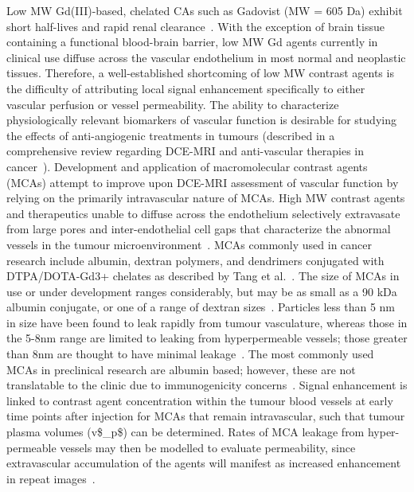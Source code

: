 Low \acs{MW} Gd(III)-based, chelated \acs{CA}s such as Gadovist (\acs{MW} = 605 \acs{Da}) exhibit short half-lives and rapid renal clearance~\cite{Weinmann:1984gv}.
With the exception of brain tissue containing a functional blood-brain barrier, low \acs{MW} Gd agents currently in clinical use diffuse across the vascular endothelium in most normal and neoplastic tissues.
Therefore, a well-established shortcoming of low \acs{MW} contrast agents is the difficulty of attributing local signal enhancement specifically to either vascular perfusion or vessel permeability.
The ability to characterize physiologically relevant biomarkers of vascular function is desirable for studying the effects of anti-angiogenic treatments in tumours (described in a comprehensive review regarding DCE-MRI and anti-vascular therapies in cancer~\cite{OConnor:2012ie}).
Development and application of macromolecular contrast agents (\acs{MCA}s) attempt to improve upon DCE-MRI assessment of vascular function by relying on the primarily intravascular nature of \acs{MCA}s.
High \acs{MW} contrast agents and therapeutics unable to diffuse across the endothelium selectively extravasate from large pores and inter-endothelial cell gaps that characterize the abnormal vessels in the tumour microenvironment~\cite{McDonald:2002ut,Hashizume:2000bq}.
\acs{MCA}s commonly used in cancer research include albumin, dextran polymers, and dendrimers conjugated with DTPA/DOTA-Gd3+ chelates as described by Tang et al.~\cite{Tang:2013fi}.
The size of \acs{MCA}s in use or under development ranges considerably, but may be as small as a 90 \acs{kDa} albumin conjugate, or one of a range of dextran sizes~\cite{Barrett:2006jx}.
Particles less than 5 nm in size have been found to leak rapidly from tumour vasculature, whereas those in the 5-8nm range are limited to leaking from hyperpermeable vessels; those greater than 8nm are thought to have minimal leakage~\cite{Kobayashi:2004vq,Sato:2001tt}.
The most commonly used \acs{MCA}s in preclinical research are albumin based; however, these are not translatable to the clinic due to immunogenicity concerns~\cite{Ogan:1987tg}.
Signal enhancement is linked to contrast agent concentration within the tumour blood vessels at early time points after injection for \acs{MCA}s that remain intravascular, such that tumour plasma volumes (\acs{v$_p$}) can be determined.
Rates of \acs{MCA} leakage from hyper-permeable vessels may then be modelled to evaluate permeability, since extravascular accumulation of the agents will manifest as increased enhancement in repeat images~\cite{Ogan:1987tg,Turetschek:2004bw}.
